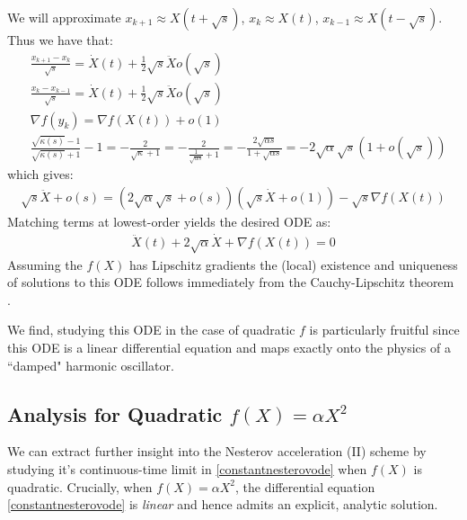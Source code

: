  We will approximate $x_{k+1} \approx X(t+\sqrt{s})$, $x_k \approx X(t)$, $x_{k-1} \approx X(t-\sqrt{s})$.
 Thus we have that:
 \begin{align*}
     & \frac{x_{k+1} - x_k}{\sqrt{s}} = \dot{X}(t) + \frac{1}{2} \sqrt{s} \ddot{X} o(\sqrt{s}) \\
     & \frac{x_k - x_{k-1}}{\sqrt{s}} = \dot{X}(t) + \frac{1}{2} \sqrt{s} \ddot{X} o(\sqrt{s}) \\
     & \nabla f(y_k) = \nabla f(X(t)) + o(1) \\
     & \frac{\sqrt{\kappa(s)}-1}{\sqrt{\kappa(s)}+1}-1 = -\frac{2}{\sqrt{\kappa}+1} = -\frac{2}{\frac{1}{\sqrt{\alpha s}}+1} = -\frac{2 \sqrt{\alpha s}}{1+\sqrt{\alpha s}} = -2 \sqrt{\alpha} \sqrt{s} (1+o(\sqrt{s}))
 \end{align*}
 which gives:
 \begin{align*}
     \sqrt{s} \ddot{X} + o(s) = (2 \sqrt{\alpha} \sqrt{s} + o(s))(\sqrt{s} \dot{X} + o(1)) - \sqrt{s} \nabla f(X(t))
 \end{align*}
 Matching terms at lowest-order yields the desired ODE as:
 \begin{align}
     \ddot{X}(t) + 2 \sqrt{\alpha} \dot{X} + \nabla f(X(t)) = 0 \label{constantnesterovode}
 \end{align}
Assuming the $f(X)$ has Lipschitz gradients the (local) existence and uniqueness of solutions to this ODE follows immediately from the Cauchy-Lipschitz theorem \cite{teschl2012ordinary}.

We find, studying this ODE in the case of quadratic $f$ is particularly fruitful since this ODE is a linear differential equation and maps exactly onto the physics of a ``damped" harmonic oscillator.

\subsection{Analysis for Quadratic $f(X) = \alpha X^2$ }

We can extract further insight into the Nesterov acceleration (II) scheme by studying it's continuous-time limit in \eqref{constantnesterovode} when $f(X)$ is quadratic. Crucially, when $f(X) = \alpha X^2$, the differential equation \eqref{constantnesterovode} is \textit{linear} and hence admits an explicit, analytic solution. 

